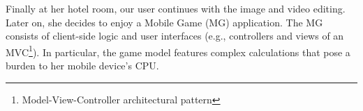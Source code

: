 




Finally at her hotel room, our user 
continues with the image and video editing. Later on, she decides to enjoy a Mobile Game (MG) application. The MG consists of client-side logic and
user interfaces (e.g., controllers and views of an MVC\footnote{Model-View-Controller architectural pattern}). In particular, the game model features complex calculations that pose a burden to her mobile device's CPU. 

